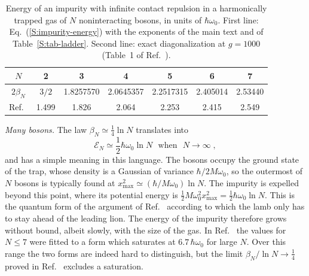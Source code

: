 \begin{table}[h]
\caption{Energy of an impurity with infinite contact repulsion in a harmonically trapped gas of $N$ noninteracting bosons, in units of $\hbar \omega_0$. First line: Eq.~(\ref{S:impurity-energy}) with the exponents of the main text and of Table~\ref{S:tab-ladder}. Second line: exact diagonalization at $g = 1000$ (Table~1 of Ref.~\cite{RIJ24}).}
\label{S:tab-impurity}
\begin{ruledtabular}
\begin{tabular}{ccccccc}
$N$ & 2 & 3 & 4 & 5 & 6 & 7\\
\hline
$2 \beta_N$ & $3/2$ & 1.8257570 & 2.0645357 & 2.2517315 & 2.405014 & 2.53440\\
Ref.~\cite{RIJ24} & 1.499 & 1.826 & 2.064 & 2.253 & 2.415 & 2.549\\
\end{tabular}
\end{ruledtabular}
\end{table}

\emph{Many bosons.} The law $\beta_N \simeq \frac{1}{4} \ln N$ \cite{KR96,LS02} translates into
\begin{equation} \label{S:impurity-large-N}
    \mathcal{E}_N \simeq \frac{1}{2} \hbar \omega_0 \ln N \mbox{~~when~~} N \to \infty \;,
\end{equation}
and has a simple meaning in this language. The bosons occupy the ground state of the trap, whose density is a Gaussian of variance $\hbar/2 M \omega_0$, so the outermost of $N$ bosons is typically found at $x_{\max}^2 \simeq (\hbar/M \omega_0) \ln N$. The impurity is expelled beyond this point, where its potential energy is $\frac{1}{2} M \omega_0^2 x_{\max}^2 = \frac{1}{2} \hbar \omega_0 \ln N$. This is the quantum form of the argument of Ref.~\cite{KR96} according to which the lamb only has to stay ahead of the leading lion. The energy of the impurity therefore grows without bound, albeit slowly, with the size of the gas. In Ref.~\cite{RIJ24} the values for $N \leq 7$ were fitted to a form which saturates at $6.7 \, \hbar \omega_0$ for large $N$. Over this range the two forms are indeed hard to distinguish, but the limit $\beta_N/\ln N \to \frac{1}{4}$ proved in Ref.~\cite{LS02} excludes a saturation.
